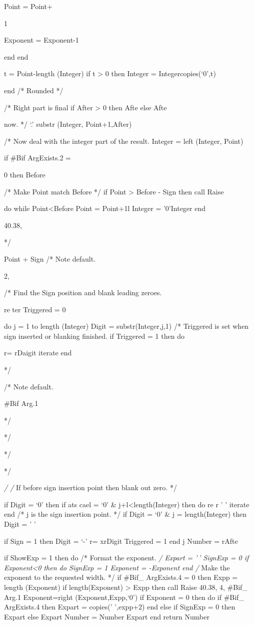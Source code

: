 Point = Point+

1

Exponent = Exponent-1

end end

t = Point-length (Integer) if t \textgreater{} 0 then Integer =
Integer\textbar\textbar copies(`0',t)

end /* Rounded */

/* Right part is final if After \textgreater{} 0 then Afte else Afte

now. */ `.'\textbar{} \textbar substr (Integer, Point+1,After)

/* Now deal with the integer part of the result. Integer = left
(Integer, Point)

if \#Bif ArgExists.2 =

0 then Before

/* Make Point match Before */ if Point \textgreater{} Before - Sign then
call Raise

do while Point\textless Before Point = Point+1l Integer = '0'Integer end

40.38,

*/

Point + Sign /* Note default.

2,

/* Find the Sign position and blank leading zeroes.

re ter Triggered = 0

do j = 1 to length (Integer) Digit = substr(Integer,j,1) /* Triggered is
set when sign inserted or blanking finished. if Triggered = 1 then do

r= r\textbar\textbar Daigit iterate end

*/

/* Note default.

\#Bif Arg.1

*/

*/

*/

*/

\emph{/ /} If before sign insertion point then blank out zero. */

if Digit = `0' then if ats cael = `0' \& j+l\textless length(Integer)
then do re r ' ' iterate end /* j is the sign insertion point. */ if
Digit = `0' \& j = length(Integer) then Digit = ' '

if Sign = 1 then Digit = `-' r= xr\textbar\textbar Digit Triggered = 1
end j Number = r\textbar\textbar Afte

if ShowExp = 1 then do /* Format the exponent. \emph{/ Expart = '\,'
SignExp = 0 if Exponent\textless0 then do SignExp = 1 Exponent =
-Exponent end /} Make the exponent to the requested width. */ if \#Bif\_
ArgExists.4 = 0 then Expp = length (Exponent) if length(Exponent)
\textgreater{} Expp then call Raise 40.38, 4, \#Bif\_ Arg.1
Exponent=right (Exponent,Expp,`0') if Exponent = 0 then do if \#Bif\_
ArgExists.4 then Expart = copies(' ',expp+2) end else if SignExp = 0
then Expart else Expart Number = Number \textbar{} \textbar Expart end
return Number

